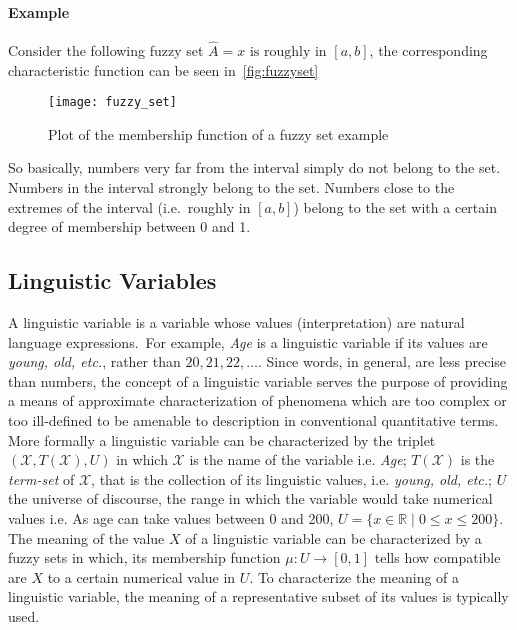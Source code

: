 \documentclass[]{article}
\begin{document}
\paragraph{Example} Consider the following fuzzy set
$ \hat{A} = x \text{ is roughly in }[a, b] $,
the corresponding characteristic function can be seen in~\autoref{fig:fuzzyset}\\
\begin{figure}[ht!]
  \centering
  \texttt{[image: fuzzy\_set]}
  \caption{Plot of the membership function of a fuzzy set example\label{fig:fuzzyset}}
\end{figure}

So basically, numbers very far from the interval simply do not belong to the set.
Numbers in the interval strongly belong to the set. Numbers close to the extremes
of the interval (i.e.\ roughly in $[a, b]$) belong to the set with a certain degree
of membership between 0 and 1.

\subsection{Linguistic Variables~\citep{Zadeh1975}}
A linguistic variable is a variable whose values (interpretation) are natural
language expressions.~For example, \textit{Age} is a linguistic variable if its
values are \textit{young, old, etc.}, rather than $20, 21, 22, \dots$.
Since words, in general, are less precise than numbers, the concept of a
linguistic variable serves the purpose of providing a means of approximate
characterization of phenomena which are too complex or too ill-defined to be
amenable to description in conventional quantitative terms. \\
More formally a linguistic variable can be characterized by the triplet
$(\mathscr{X}, T(\mathscr{X}), U)$ in which $\mathscr{X}$ is the name of
the variable i.e. \textit{Age}; $T(\mathscr{X})$ is the \textit{term-set} of
$\mathscr{X}$, that is the collection of its linguistic values, i.e.
\textit{young, old, etc.}; $U$ the universe of discourse, the range in
which the variable would take numerical values i.e. As age can take
values between 0 and 200, $U = \{x \in \mathbb{R} \mid 0\leq x\leq 200\}$.\\
The meaning of the value $X$ of a linguistic variable can be characterized by
a fuzzy sets in which, its membership function $\mu: U\to [0, 1]$ tells how
compatible are $X$ to a certain numerical value in $U$. To characterize the
meaning of a linguistic variable, the meaning of a representative subset of its
values is typically used.
\end{document}
